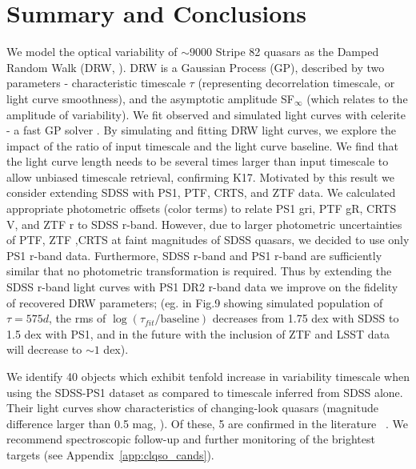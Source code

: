 \documentclass[twocolumn]{aastex62}
\newcommand{\project}[1]{\textsf{#1}}
\begin{document}
%
%
%
%

\section{Summary and Conclusions}
\label{sec:conclusions}
We model the optical variability of ${\sim} 9000$ Stripe 82 quasars as the Damped Random Walk (DRW, \citealt{kelly2009}). DRW is a Gaussian Process (GP), described by two parameters - characteristic timescale $\tau$ (representing decorrelation timescale, or light curve smoothness), and the asymptotic amplitude SF$_{\infty}$ (which relates to the amplitude of variability). We fit observed and simulated light curves with \project{celerite} - a fast GP solver \citep{foreman2017}. By simulating and fitting DRW light curves, we explore the impact of the ratio of input timescale and the light curve baseline. We find that the light curve length needs to be several times larger than input timescale to allow unbiased timescale retrieval, confirming K17. Motivated by this result we consider extending SDSS with PS1, PTF, CRTS, and ZTF data.  We calculated appropriate photometric offsets (color terms) to relate PS1 gri, PTF gR,  CRTS V, and ZTF r to SDSS r-band. However, due to larger photometric uncertainties of PTF, ZTF ,CRTS at faint magnitudes of SDSS quasars, we decided to use only PS1 r-band data. Furthermore, SDSS r-band and PS1 r-band are sufficiently similar that no photometric transformation is required.  Thus by extending the SDSS r-band light curves with PS1 DR2 r-band data we improve on the fidelity of recovered DRW parameters; (eg. in Fig.9 showing simulated population of $\tau=575d$, the rms of $\log{(\tau_{fit}/ \mathrm{baseline})}$ decreases from 1.75 dex with SDSS to 1.5 dex with PS1, and in the future with the inclusion of ZTF and LSST data will decrease to $\sim 1$ dex).  

We identify 40 objects which exhibit tenfold increase in variability timescale when using the SDSS-PS1 dataset as compared to timescale inferred from SDSS alone. Their light curves show characteristics of changing-look quasars (magnitude difference larger than 0.5 mag, \citealt{macleod2016}). Of these, 5 are confirmed in the literature ~\citep{macleod2019, lamassa2015}. We recommend spectroscopic follow-up and further monitoring of the brightest targets (see Appendix~\ref{app:clqso_cands}).
\end{document}
